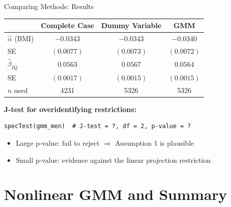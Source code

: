\documentclass[aspectratio=169, handout, t]{beamer}
\numberwithin{equation}{section}
\begin{document}
\begin{frame}[fragile]{Comparing Methods: Results}

\begin{table}[h]
\centering
\begin{tabular}{lccc}
\toprule
& \textbf{Complete Case} & \textbf{Dummy Variable} & \textbf{GMM} \\
\midrule
$\hat\alpha$ (BMI) & $-0.0343$ & $-0.0343$ & $-0.0340$ \\
SE & $(0.0077)$ & $(0.0073)$ & $(0.0072)$ \\[4pt]
$\hat\beta_{IQ}$ & $0.0563$ & $0.0567$ & $0.0564$ \\
SE & $(0.0017)$ & $(0.0015)$ & $(0.0015)$ \\[4pt]
$n$ used & 4231 & 5326 & 5326 \\
\bottomrule
\end{tabular}
\end{table}

\medskip
\textbf{J-test for overidentifying restrictions:}
\begin{lstlisting}[basicstyle=\ttfamily\footnotesize]
specTest(gmm_men)  # J-test = ?, df = 2, p-value = ?
\end{lstlisting}

\begin{itemize}
\item Large p-value: fail to reject $\Rightarrow$ Assumption 1 is plausible
\item Small p-value: evidence against the linear projection restriction
\end{itemize}

\end{frame}

\section{Nonlinear GMM and Summary}
\end{document}
